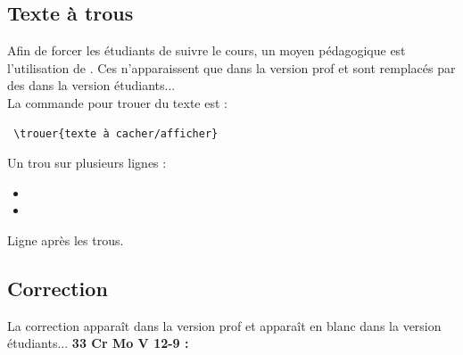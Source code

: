 \documentclass[b,e,cours]{D:/hubiC/GitHub/test_Baggio/paquets/classe_kara}
\begin{document}
\subsection{Texte à trous}

\begin{frame}[fragile]
Afin de forcer les étudiants de suivre le cours, un moyen pédagogique est l'utilisation de . Ces  n'apparaissent que dans la version prof et sont remplacés par des  dans la version étudiants...\\
La commande pour trouer du texte est : \begin{verbatim} \trouer{texte à cacher/afficher} \end{verbatim}


Un trou sur plusieurs lignes :

\begin{itemize}
\item {}
\item {}
\end{itemize}



Ligne après les trous.

\end{frame}

\subsection{Correction}
\begin{frame}[fragile]

La correction apparaît dans la version prof et apparaît en blanc dans la version étudiants...\newline
\textbf{33 Cr Mo V 12-9 : } \\
\end{frame}

\end{document}
